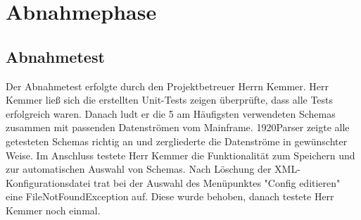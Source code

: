 \section{Abnahmephase} 
\label{sec:Abnahmephase}
\subsection{Abnahmetest}
\label{sec:Abnahmetest}
Der Abnahmetest erfolgte durch den Projektbetreuer Herrn Kemmer. Herr Kemmer ließ sich die erstellten Unit-Tests zeigen überprüfte, dass alle Tests erfolgreich waren. Danach ludt er die 5 am Häufigsten verwendeten Schemas zusammen mit passenden Datenströmen vom Mainframe. 1920Parser zeigte alle getesteten Schemas richtig an und zergliederte die Datenströme in gewünschter Weise. Im Anschluss testete Herr Kemmer die Funktionalität zum Speichern und zur automatischen Auswahl von Schemas. Nach Löschung der XML-Konfigurationsdatei trat bei der Auswahl des Menüpunktes "Config editieren" eine FileNotFoundException auf. Diese wurde behoben, danach testete Herr Kemmer noch einmal.

